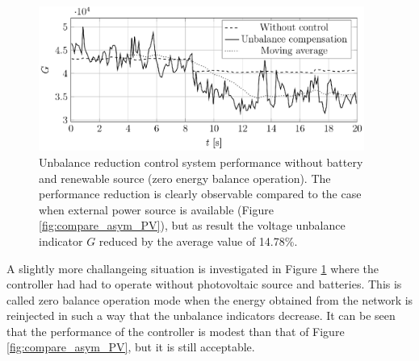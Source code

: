             \begin{figure}[ht]
            \centering
            \includegraphics[width=0.95\textwidth]{Unblance_EPS_Pics/UnbalRedComp_JCP-figure4.eps}
                 \caption{Unbalance reduction control system performance without battery and renewable source (zero energy balance operation). The performance reduction is clearly observable compared to the case when external power source is available (Figure \ref{fig:compare_asym_PV}), but as result the voltage unbalance indicator $G$ reduced by the average value of 14.78\%.}
                 \label{fig:compare_asym}
                \end{figure}

            A slightly more challangeing situation is investigated in Figure \ref{fig:compare_asym} where the controller had had to operate without photovoltaic source and batteries. This is called zero balance operation mode when the energy obtained from the network is reinjected in such a way that the unbalance indicators decrease. It can be seen that the performance of the controller is modest than that of Figure \ref{fig:compare_asym_PV}, but it is still acceptable.

